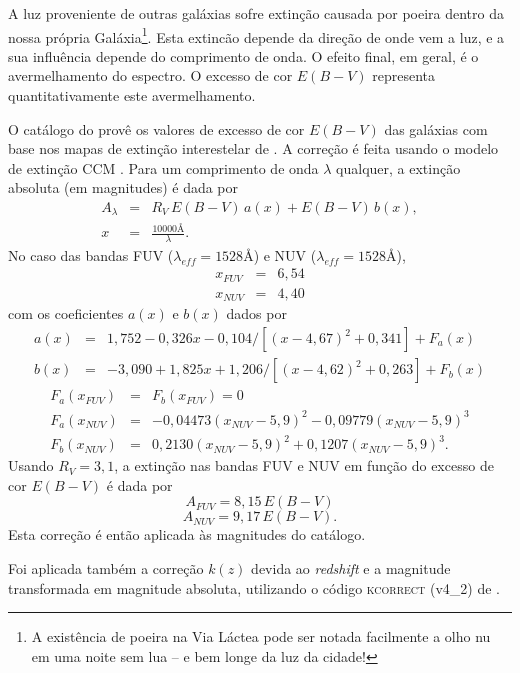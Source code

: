 A luz proveniente de outras galáxias sofre extinção causada por poeira dentro da
nossa própria Galáxia\footnote{A existência de poeira na Via Láctea pode ser
notada facilmente a olho nu em uma noite sem lua -- e bem longe da luz da
cidade!}. Esta extincão depende da direção de onde vem a luz, e a sua influência
depende do comprimento de onda. O efeito final, em geral, é o avermelhamento do
espectro. O excesso de cor $E(B-V)$ representa quantitativamente este
avermelhamento.

O catálogo do \galex provê os valores de excesso de cor $E(B-V)$ das galáxias
com base nos mapas de extinção interestelar de \citet{Schlegel1998}. A correção
é feita usando o modelo de extinção CCM \citep[equações 4a e 4b]{Cardelli1989}.
Para um comprimento de onda $\lambda$ qualquer, a extinção absoluta (em
magnitudes) é dada por
\begin{eqnarray}
	A_\lambda &=& R_V\,E(B-V)\,a(x) + E(B-V)\,b(x), \\
	x &=& \frac{10000\text{\AA}}{\lambda}.
\end{eqnarray}
No caso das bandas FUV ($\lambda_{eff}=1528\text{\AA}$) e NUV
($\lambda_{eff}=1528\text{\AA}$),
\begin{eqnarray}
	x_{FUV} &=& 6,54 \\
	x_{NUV} &=& 4,40
\end{eqnarray}
com os coeficientes $a(x)$ e $b(x)$ dados por
\begin{eqnarray}
	a(x) &=& 1,752 - 0,326x - 0,104/[(x-4,67)^2 + 0,341] + F_a(x) \\
	b(x) &=& -3,090 + 1,825x + 1,206/[(x-4,62)^2 + 0,263] + F_b(x)
\end{eqnarray}
\begin{eqnarray}
	F_a(x_{FUV}) &=& F_b(x_{FUV}) = 0 \\
	F_a(x_{NUV}) &=& -0,04473(x_{NUV}-5,9)^2 - 0,09779(x_{NUV}-5,9)^3 \\
	F_b(x_{NUV}) &=& 0,2130(x_{NUV}-5,9)^2 + 0,1207(x_{NUV}-5,9)^3.
\end{eqnarray}
Usando $R_V=3,1$, a extinção nas bandas FUV e NUV em função do excesso de cor
$E(B-V)$ é dada por
\begin{equation}
	A_{FUV} = 8,15\,E(B-V)
\end{equation}
\begin{equation}
	A_{NUV} = 9,17\,E(B-V).
\end{equation}
Esta correção é então aplicada às magnitudes do catálogo.

Foi aplicada também a correção $k(z)$ devida ao {\em redshift} e a magnitude
transformada em magnitude absoluta, utilizando o código \textsc{kcorrect}
(v4\_2) de \citet{Blanton2007}.


